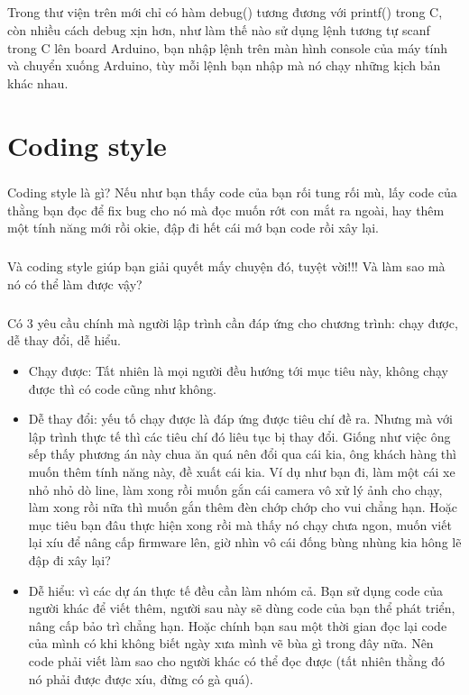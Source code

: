 \documentclass[12pt,a5paper]{book}
\begin{document}
\paragraph{}
Trong thư viện trên mới chỉ có hàm debug() tương đương với printf() trong C, còn nhiều cách debug xịn hơn, như làm thế nào sử dụng lệnh tương tự scanf trong C lên board Arduino, bạn nhập lệnh trên màn hình console của máy tính và chuyển xuống Arduino, tùy mỗi lệnh bạn nhập mà nó chạy những kịch bản khác nhau.
\paragraph{}
\chapter{Coding style}
\paragraph{}
Coding style là gì? Nếu như bạn thấy code của bạn rối tung rối mù, lấy code của thằng bạn đọc để fix bug cho nó mà đọc muốn rớt con mắt ra ngoài, hay thêm một tính năng mới rồi okie, đập đi hết cái mớ bạn code rồi xây lại.
\paragraph{}
Và coding style giúp bạn giải quyết mấy chuyện đó, tuyệt vời!!! Và làm sao mà nó có thể làm được vậy?
\paragraph{}
Có 3 yêu cầu chính mà người lập trình cần đáp ứng cho chương trình: chạy được, dễ thay đổi, dễ hiểu.
\begin{itemize}
  \item Chạy được: Tất nhiên là mọi người đều hướng tới mục tiêu này, không chạy được thì có code cũng như không.
  \item Dễ thay đổi: yếu tố chạy được là đáp ứng được tiêu chí đề ra. Nhưng mà với lập trình thực tế thì các tiêu chí đó liêu tục bị thay đổi. Giống như việc ông sếp thấy phương án này chua ăn quá nên đổi qua cái kia, ông khách hàng thì muốn thêm tính năng này, đề xuất cái kia. Ví dụ như bạn đi, làm một cái xe nhỏ nhỏ dò line, làm xong rồi muốn gắn cái camera vô xử lý ảnh cho chạy, làm xong rồi nữa thì muốn gắn thêm đèn chớp chớp cho vui chẳng hạn. Hoặc mục tiêu bạn đâu thực hiện xong rồi mà thấy nó chạy chưa ngon, muốn viết lại xíu để nâng cấp firmware lên, giờ nhìn vô cái đống bùng nhùng kia hông lẽ đập đi xây lại?
	\item Dễ hiểu: vì các dự án thực tế đều cần làm nhóm cả. Bạn sử dụng code của người khác để viết thêm, người sau này sẽ dùng code của bạn thể phát triển, nâng cấp bảo trì chẳng hạn. Hoặc chính bạn sau một thời gian đọc lại code của mình có khi không biết ngày xưa mình vẽ bùa gì trong đây nữa. Nên code phải viết làm sao cho người khác có thể đọc được (tất nhiên thằng đó nó phải được được xíu, đừng có gà quá).
\end{itemize}
\end{document}
